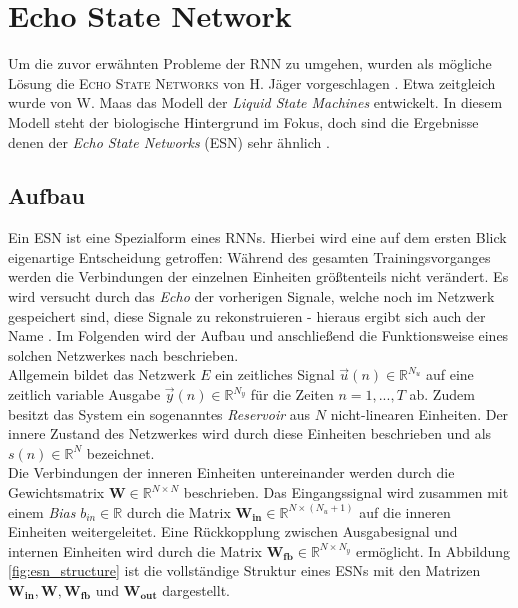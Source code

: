 \section{Echo State Network}
\label{sc:esn}
Um die zuvor erwähnten Probleme der \textsc{RNN} zu umgehen, wurden als mögliche Lösung die \textsc{Echo State Networks} von H. Jäger vorgeschlagen \cite{jaeger2010}. Etwa zeitgleich wurde von W. Maas das Modell der \textit{Liquid State Machines} entwickelt. In diesem Modell steht der biologische Hintergrund im Fokus, doch sind die Ergebnisse denen der \textit{Echo State Networks} (\textsc{ESN}) sehr ähnlich \citep{Maass2011}. 

\subsection{Aufbau}
\label{sec:esn_structure}
Ein \textsc{ESN} ist eine Spezialform eines \textsc{RNN}s. Hierbei wird eine auf dem ersten Blick eigenartige Entscheidung getroffen: Während des gesamten Trainingsvorganges werden die Verbindungen der einzelnen Einheiten größtenteils nicht verändert. Es wird versucht durch das \textit{Echo} der vorherigen Signale, welche noch im Netzwerk gespeichert sind, diese Signale zu rekonstruieren - hieraus ergibt sich auch der Name \cite{lukoseviciusa2009}. Im Folgenden wird der Aufbau und anschließend die Funktionsweise eines solchen Netzwerkes nach \citep{jaeger2007} beschrieben.\\

Allgemein bildet das Netzwerk $E$ ein zeitliches Signal $\vec{u}(n) \in \mathbb{R}^{N_u}$  auf eine zeitlich variable Ausgabe $\vec{y}(n) \in \mathbb{R}^{N_y}$ für die Zeiten $n=1, ..., T$ ab. Zudem besitzt das System ein sogenanntes \textit{Reservoir} aus $N$ nicht-linearen Einheiten. Der innere Zustand des Netzwerkes wird durch diese Einheiten beschrieben und als $s(n) \in \mathbb{R}^{N}$ bezeichnet.\\

Die Verbindungen der inneren Einheiten untereinander werden durch die Gewichtsmatrix $\mathbf{W} \in \mathbb{R}^{N \times N}$ beschrieben. Das Eingangssignal wird zusammen mit einem \textit{Bias} $b_{in} \in \mathbb{R}$ durch die Matrix $\mathbf{W_{in}} \in \mathbb{R}^{N \times (N_u+1)}$ auf die inneren Einheiten weitergeleitet. Eine Rückkopplung zwischen Ausgabesignal und internen Einheiten wird durch die Matrix $\mathbf{W_{fb}} \in \mathbb{R}^{N \times N_y}$ ermöglicht. In Abbildung \ref{fig:esn_structure} ist die vollständige Struktur eines \textsc{ESN}s mit den Matrizen $\mathbf{W_{in}}, \mathbf{W}, \mathbf{W_{fb}}$ und $\mathbf{W_{out}}$ dargestellt.

